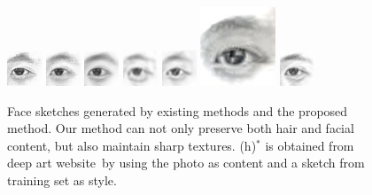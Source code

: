 \documentclass[10pt,twocolumn,letterpaper]{article}
\begin{document}
\begin{figure}[t]
\begin{minipage}[t]{1\linewidth}
\includegraphics[width=0.11\linewidth]{img/page1_example/eye_mrf.png}
\includegraphics[width=0.11\linewidth]{img/page1_example/eye_wmrf.png}
\includegraphics[width=0.11\linewidth]{img/page1_example/eye_ssd.png}
\includegraphics[width=0.11\linewidth]{img/page1_example/eye_fcnn.png}
\includegraphics[width=0.11\linewidth]{img/page1_example/eye_bfcn.png}
\includegraphics[width=0.11\linewidth]{img/page1_example/eye_deepart.jpg}
\includegraphics[width=0.11\linewidth]{img/page1_example/eye_ours.png}
\end{minipage}
\caption[Caption for LOF]{Face sketches generated by existing methods and the proposed method. Our method can not only preserve both hair and facial content, but also maintain sharp textures. \setcounter{footnote}{0} (h)$^*$ is obtained from deep art website\footnotemark~by using the photo as content and a sketch from training set as style.}
\label{fig:example_comp}
\end{figure}
\end{document}
